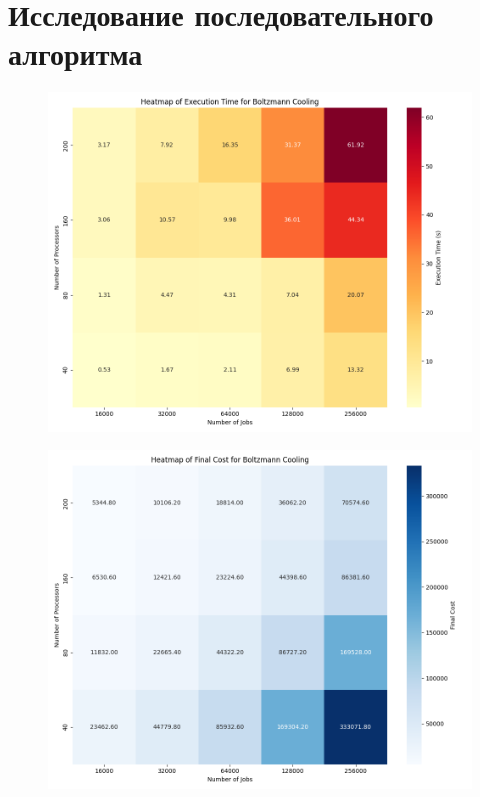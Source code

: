 \documentclass[openany, twoside, a4paper, 12pt]{extbook}
\begin{document}
\section*{Исследование последовательного алгоритма}
\begin{figure}[ht]
    \centering
    \begin{minipage}{0.49\textwidth}
        \centering
        \includegraphics[width=\textwidth]{results_solo/boltzmann_cooling_heatmap_execution_time.png}
        \label{fig:image1}
    \end{minipage}
    \hfill
    \begin{minipage}{0.49\textwidth}
        \centering
        \includegraphics[width=\textwidth]{results_solo/boltzmann_cooling_heatmap_final_cost.png}
        \label{fig:image2}
    \end{minipage}
    \vspace{-50pt} %
\end{figure}
\end{document}
